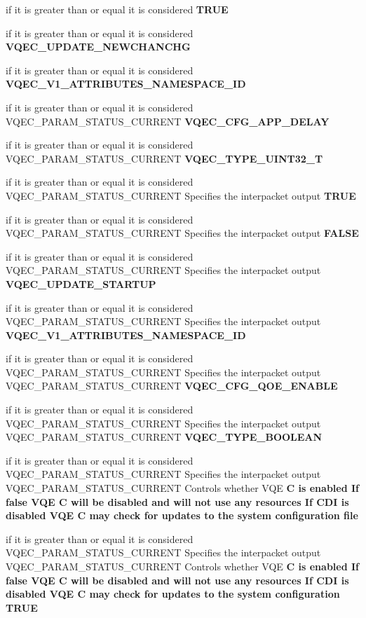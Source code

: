 \begin{CompactItemize}
\item 
if it is greater than or equal it is considered \bf{TRUE}
\item 
if it is greater than or equal it is considered \bf{VQEC\_\-UPDATE\_\-NEWCHANCHG}
\item 
if it is greater than or equal it is considered \bf{VQEC\_\-V1\_\-ATTRIBUTES\_\-NAMESPACE\_\-ID}
\item 
if it is greater than or equal it is considered VQEC\_\-PARAM\_\-STATUS\_\-CURRENT \bf{VQEC\_\-CFG\_\-APP\_\-DELAY}
\item 
if it is greater than or equal it is considered VQEC\_\-PARAM\_\-STATUS\_\-CURRENT \bf{VQEC\_\-TYPE\_\-UINT32\_\-T}
\item 
if it is greater than or equal it is considered VQEC\_\-PARAM\_\-STATUS\_\-CURRENT Specifies the interpacket output \bf{TRUE}
\item 
if it is greater than or equal it is considered VQEC\_\-PARAM\_\-STATUS\_\-CURRENT Specifies the interpacket output \bf{FALSE}
\item 
if it is greater than or equal it is considered VQEC\_\-PARAM\_\-STATUS\_\-CURRENT Specifies the interpacket output \bf{VQEC\_\-UPDATE\_\-STARTUP}
\item 
if it is greater than or equal it is considered VQEC\_\-PARAM\_\-STATUS\_\-CURRENT Specifies the interpacket output \bf{VQEC\_\-V1\_\-ATTRIBUTES\_\-NAMESPACE\_\-ID}
\item 
if it is greater than or equal it is considered VQEC\_\-PARAM\_\-STATUS\_\-CURRENT Specifies the interpacket output VQEC\_\-PARAM\_\-STATUS\_\-CURRENT \bf{VQEC\_\-CFG\_\-QOE\_\-ENABLE}
\item 
if it is greater than or equal it is considered VQEC\_\-PARAM\_\-STATUS\_\-CURRENT Specifies the interpacket output VQEC\_\-PARAM\_\-STATUS\_\-CURRENT \bf{VQEC\_\-TYPE\_\-BOOLEAN}
\item 
if it is greater than or equal it is considered VQEC\_\-PARAM\_\-STATUS\_\-CURRENT Specifies the interpacket output VQEC\_\-PARAM\_\-STATUS\_\-CURRENT Controls whether VQE \bf{C} is enabled If false VQE \bf{C} will be disabled and will not use any resources If CDI is disabled VQE \bf{C} may check for updates \bf{to} the system configuration \bf{file}
\item 
if it is greater than or equal it is considered VQEC\_\-PARAM\_\-STATUS\_\-CURRENT Specifies the interpacket output VQEC\_\-PARAM\_\-STATUS\_\-CURRENT Controls whether VQE \bf{C} is enabled If false VQE \bf{C} will be disabled and will not use any resources If CDI is disabled VQE \bf{C} may check for updates \bf{to} the system configuration \bf{TRUE}

\end{CompactItemize}
